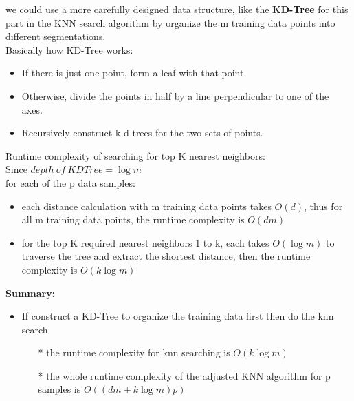 \documentclass[11pt]{article}
\providecommand{\tightlist}{%
      \setlength{\itemsep}{0pt}\setlength{\parskip}{0pt}}
\begin{document}
\noindent we could use a more carefully designed data structure, like the
\textbf{KD-Tree} for this part in the KNN search algorithm by organize
the m training data points into different segmentations.\\

\noindent Basically how KD-Tree works:

\begin{itemize}
\item
  If there is just one point, form a leaf with that point.
\item
  Otherwise, divide the points in half by a line perpendicular to one of
  the axes.
\item
  Recursively construct k-d trees for the two sets of points.
\end{itemize}



 \noindent Runtime complexity of searching for top K nearest neighbors:\\

Since \(depth \: of \: KDTree = \log m\) \\

\noindent for each of the p data samples:
\begin{itemize}
\tightlist
\item 
	each distance calculation with m training data points takes \(O(d)\),
	thus for all m training data points, the runtime complexity is
	\(O(dm)\)
\item
   for the top K required nearest neighbors 1 to k, each takes \(O( \log m)\) to traverse the tree and extract the shortest distance, then the runtime complexity is \(O(k \log m)\)
\end{itemize}

\noindent \textbf{Summary: }

\begin{itemize}
\tightlist
\item
  If construct a KD-Tree to organize the training data first then do the
  knn search

  \begin{itemize}
  \tightlist
  \item[*]
    the runtime complexity for knn searching is \(O(k \log m)\)
    \item[*]
    the whole runtime complexity of the adjusted KNN algorithm for p samples is 
    \(O((dm+k \log m)p)\)
  \end{itemize}
\end{itemize}
\end{document}
